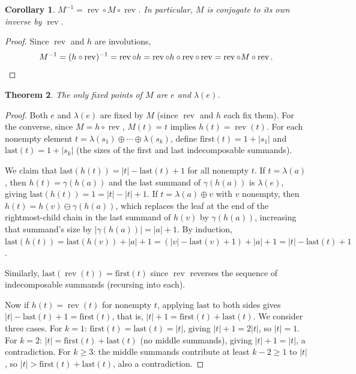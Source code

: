 \documentclass[a4paper,11pt]{article}
\newtheorem{theorem}{Theorem}[section]
\newtheorem{corollary}[theorem]{Corollary}
\theoremstyle{definition}
\DeclareMathOperator{\rev}{rev}
\begin{document}
\begin{corollary}
$M^{-1} = \rev \circ M \circ \rev$.  In particular, $M$ is conjugate to its own inverse by
$\rev$.

\end{corollary}

\begin{proof}
Since $\rev$ and $h$ are involutions,
\[
  M^{-1} = (h \circ \rev)^{-1} = \rev \circ h
    = \rev \circ h \circ \rev \circ \rev = \rev \circ M \circ \rev. \qedhere
\]
\end{proof}

\begin{theorem}\label{thm:M-no-fixedpoints}
The only fixed points of $M$ are $e$ and $\lambda(e)$.
\end{theorem}

\begin{proof}
Both $e$ and $\lambda(e)$ are fixed by $M$
(since $\rev$ and $h$ each fix them).
For the converse,
since $M = h \circ \rev$, $M(t) = t$ implies $h(t) = \rev(t)$.
For each nonempty element
$t = \lambda(s_1) \oplus \cdots \oplus \lambda(s_k)$,
define $\mathrm{first}(t) = 1 + |s_1|$ and
$\mathrm{last}(t) = 1 + |s_k|$ (the sizes of the first
and last indecomposable summands).

We claim that $\mathrm{last}(h(t))
= |t| - \mathrm{last}(t) + 1$
for all nonempty $t$. If $t = \lambda(a)$, then
$h(t) = \gamma(h(a))$ and the last summand of
$\gamma(h(a))$ is $\lambda(e)$, giving
$\mathrm{last}(h(t)) = 1 = |t| - |t| + 1$.
If $t = \lambda(a) \oplus v$ with $v$ nonempty, then
$h(t) = h(v) \ominus \gamma(h(a))$, which replaces the
leaf at the end of the rightmost-child chain in the last
summand of $h(v)$ by $\gamma(h(a))$, increasing that
summand's size by $|\gamma(h(a))| = |a| + 1$.
By induction,
$\mathrm{last}(h(t))
= \mathrm{last}(h(v)) + |a| + 1
= (|v| - \mathrm{last}(v) + 1) + |a| + 1
= |t| - \mathrm{last}(t) + 1$.

Similarly, $\mathrm{last}(\rev(t))
= \mathrm{first}(t)$
since $\rev$ reverses the sequence of indecomposable
summands (recursing into each).

Now if $h(t) = \rev(t)$ for nonempty $t$, applying
$\mathrm{last}$ to both sides gives
$|t| - \mathrm{last}(t) + 1 = \mathrm{first}(t)$,
that is,
$|t| + 1 = \mathrm{first}(t) + \mathrm{last}(t)$.
We consider three cases. For $k = 1$:
$\mathrm{first}(t) = \mathrm{last}(t) = |t|$, giving
$|t| + 1 = 2|t|$, so $|t| = 1$.
For $k = 2$: $|t| = \mathrm{first}(t) +
\mathrm{last}(t)$ (no middle summands), giving
$|t| + 1 = |t|$, a contradiction.
For $k \geq 3$: the middle summands contribute at
least $k - 2 \geq 1$ to $|t|$, so
$|t| > \mathrm{first}(t) + \mathrm{last}(t)$,
also a contradiction.
\end{proof}
\end{document}
